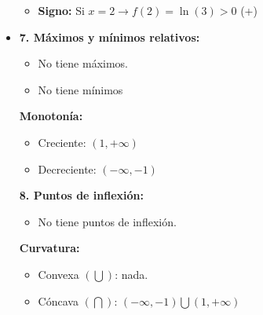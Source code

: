\begin{itemize}
\begin{itemize}
		\item \textbf{Signo: }Si $x=2 \rightarrow f(2)=\ln(3)>0$ (+)
	\end{itemize}
	\item \textbf{7. Máximos y mínimos relativos: }\\
	\begin{itemize}
		\item No tiene máximos.
		\item No tiene mínimos
	\end{itemize}
	\textbf{Monotonía: }\\
	\begin{itemize}
		\item Creciente: $(1, +\infty)$
		\item Decreciente: $(-\infty, -1)$
	\end{itemize}
	\textbf{8. Puntos de inflexión: }\\
	\begin{itemize}
		\item No tiene puntos de inflexión.
	\end{itemize}
	\textbf{Curvatura: }\\
	\begin{itemize}
		\item Convexa $(\bigcup)$: nada.
		\item Cóncava $(\bigcap)$: $(-\infty, -1) \bigcup (1, +\infty)$
	\end{itemize}
\end{itemize}
